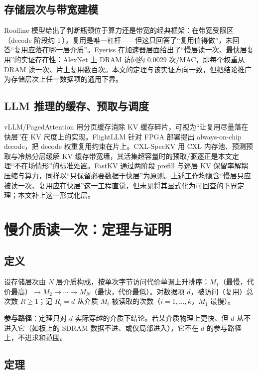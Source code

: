 \documentclass[11pt]{ctexart}
\begin{document}
\subsection{存储层次与带宽建模}

Roofline 模型\cite{roofline}给出了判断瓶颈位于算力还是带宽的经典框架：在带宽受限区（decode 阶段约 1\,），复用是唯一杠杆——但这只回答了“复用值得做”，未回答“复用应落在哪一层介质”。Eyeriss\cite{eyeriss} 在加速器层面给出了“慢层读一次、最快层复用”的实证存在性：AlexNet 上 DRAM 访问约 0.0029 次/MAC，即每个权重从 DRAM 读一次、片上复用数百次。本文的定理与该实证方向一致，但把结论推广为存储层次上任一数据项的通用下界。

\subsection{LLM 推理的缓存、预取与调度}

vLLM/PagedAttention\cite{paged} 用分页缓存消除 KV 缓存碎片，可视为“让复用尽量落在快层”在 KV 尺度上的实现。FlightLLM\cite{flightllm} 针对 FPGA 部署提出 always-on-chip decode，把 decode 权重复用约束在片上。CXL-SpecKV\cite{cxlspeckv} 用 CXL 内存池、预测预取与冷热分层缓解 KV 缓存带宽墙，其活集超容量时的预取/驱逐正是本文定理“不在场情形”的标准处置。FastKV\cite{fastkv} 通过两阶段 prefill 与逐层 KV 保留率解耦压缩与算力，同样以“只保留必要数据于快层”为原则。上述工作均隐含“慢层只应被读一次、复用应在快层”这一工程直觉，但未见将其显式化为可回查的下界定理；本文补上这一形式化层。

\section{慢介质读一次：定理与证明}

\subsection{定义}

设存储层次由 $N$ 层介质构成，按单次字节访问代价单调上升排序：$M_1$（最慢，代价最高）$\to M_2\to\cdots\to M_N$（最快，代价最低）。对数据项 $d$，被访问（复用）总次数 $R\ge 1$；记 $R_i=d$ 从介质 $M_i$ 被读取的次数（$i=1,\dots,k$，$M_1$ 最慢）。

\textbf{参与路径}：定理只对 $d$ 实际穿越的介质下结论。若某介质物理上更快、但 $d$ 从不进入它（如板上的 SDRAM 数据不进、或仅局部进入），它不在 $d$ 的参与路径上，不进求和范围。

\subsection{定理}
\end{document}
